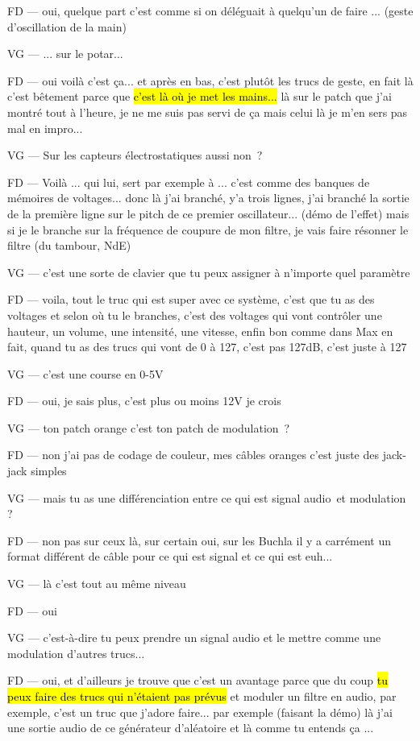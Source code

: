 FD — oui, quelque part c'est comme si on déléguait à quelqu'un de faire ... (geste d'oscillation de la main) 

VG — ... sur le potar... 

FD — oui voilà c'est ça... et après en bas, c'est plutôt les trucs de geste, en fait là c'est bêtement parce que \hl{c'est là où je met les mains... } là sur le patch que j'ai montré tout à l'heure, je ne me suis pas servi de ça mais celui là je m'en sers pas mal en impro... 

VG — Sur les capteurs électrostatiques aussi non ? 

FD — Voilà ... qui lui, sert par exemple à ... c'est comme des banques de mémoires de voltages... donc là j'ai branché, y'a trois lignes, j'ai branché la sortie de la première ligne sur le pitch de ce premier oscillateur... (démo de l'effet) mais si je le branche sur la fréquence de coupure de mon filtre, je vais faire résonner le filtre (du tambour, NdE) 

VG — c'est une sorte de clavier que tu peux assigner à n'importe quel paramètre 

FD — voila, tout le truc qui est super avec ce système, c'est que tu as des voltages et selon où tu le branches, c'est des voltages qui vont contrôler une hauteur, un volume, une intensité, une vitesse, enfin bon comme dans Max en fait, quand tu as des trucs qui vont de 0 à 127, c'est pas 127dB, c'est juste à 127  

VG — c'est une course en 0-5V 

FD — oui, je sais plus, c'est plus ou moins 12V je crois 

VG — ton patch orange c'est ton patch de modulation ? 

FD — non j'ai pas de codage de couleur, mes câbles oranges c'est juste des jack-jack simples 

VG — mais tu as une différenciation entre ce qui est signal audio et modulation ? 

FD — non pas sur ceux là, sur certain oui, sur les Buchla il y a carrément un format différent de câble pour ce qui est signal et ce qui est euh... 

VG — là c'est tout au même niveau 

FD — oui 

VG — c'est-à-dire tu peux prendre un signal audio et le mettre comme une modulation d'autres trucs... 

FD — oui, et d'ailleurs je trouve que c'est un avantage parce que du coup \hl{tu peux faire des trucs qui n'étaient pas prévus} et moduler un filtre en audio, par exemple, c'est un truc que j'adore faire... par exemple (faisant la démo) là j'ai une sortie audio de ce générateur d'aléatoire et là comme tu entends ça ... 

